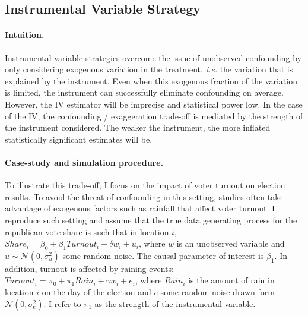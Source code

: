 \documentclass[usletter, 12pt]{article}
\begin{document}
        
		
        		\subsection{Instrumental Variable Strategy}\label{sim_IV}
            
                		\paragraph{Intuition.} 
        			Instrumental variable strategies overcome the issue of unobserved confounding by only considering exogenous variation in the treatment, \textit{i.e.} the variation that is explained by the instrument. Even when this exogenous fraction of the variation is limited, the instrument can successfully eliminate confounding on average. However, the IV estimator will be imprecise and statistical power low. In the case of the IV, the confounding / exaggeration trade-off is mediated by the strength of the instrument considered. The weaker the instrument, the more inflated statistically significant estimates will be.
        		
        			\paragraph{Case-study and simulation procedure.} 
        			To illustrate this trade-off, I focus on the impact of voter turnout on election results. To avoid the threat of confounding in this setting, studies often take advantage of exogenous factors such as rainfall that affect voter turnout. I reproduce such setting and assume that the true data generating process for the republican vote share is such that  in location $i$, $Share_{i} = \beta_{0} + \beta_{1} Turnout_{i} + \delta w_{i} + u_{i}$, where $w$ is an unobserved variable and $u \sim \mathcal{N}(0, \sigma_{u}^{2})$ some random noise. The causal parameter of interest is $\beta_{1}$. In addition, turnout is affected by raining events: $Turnout_{i} = \pi_{0} + \pi_{1} Rain_{i} + \gamma w_{i} + e_{i}$, where $Rain_{i}$ is the amount of rain in location $i$ on the day of the election 
			and $e$ some random noise drawn form $\mathcal{N}(0, \sigma_{e}^{2})$. I refer to $\pi_{1}$ as the strength of the instrumental variable. 
        			
\end{document}
